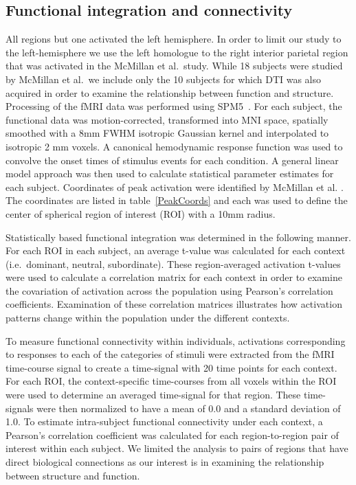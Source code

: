 \documentclass[final,authoryear,5p,times,twocolumn]{elsarticle}
\begin{document}
\subsection{Functional integration and connectivity}
All regions but one activated the left hemisphere. In order to limit our study to the left-hemisphere we use the left homologue to the right interior parietal region that was activated in the McMillan et al.\ study. While 18 subjects were studied by McMillan et al.\, we include only the 10 subjects for which DTI was also acquired in order to examine the relationship between function and structure. Processing of the fMRI data was performed using SPM5~\citep{SPM5}. For each subject, the functional data was motion-corrected, transformed into MNI space, spatially smoothed with a 8mm FWHM isotropic Gaussian kernel and interpolated to isotropic 2 mm voxels. A canonical hemodynamic response function was used to convolve the onset times of stimulus events for each condition. A general linear model approach was then used to calculate statistical parameter estimates for each subject. Coordinates of peak activation were identified by McMillan et al. \citep{McMillan2010}. The coordinates are listed in table~\ref{PeakCoords} and each was used to define the center of spherical region of interest (ROI) with a 10mm radius. 

Statistically based functional integration was determined in the following manner. For each ROI in each subject, an average t-value was calculated for each context (i.e.\ dominant, neutral, subordinate). These region-averaged activation t-values were used to calculate a correlation matrix for each context in order to examine the covariation of activation across the population using Pearson's correlation coefficients. Examination of these correlation matrices illustrates how activation patterns change within the population under the different contexts.

To measure functional connectivity within individuals, activations corresponding to responses to each of the categories of stimuli were extracted from the fMRI time-course signal to create a time-signal with 20 time points for each context. For each ROI, the context-specific time-courses from all voxels within the ROI were used to determine an averaged time-signal for that region. These time-signals were then normalized to have a mean of 0.0 and a standard deviation of 1.0. To estimate intra-subject functional connectivity under each context, a Pearson's correlation coefficient was calculated for each region-to-region pair of interest within each subject. We limited the analysis to pairs of regions that have direct biological connections as our interest is in examining the relationship between structure and function.
\end{document}
